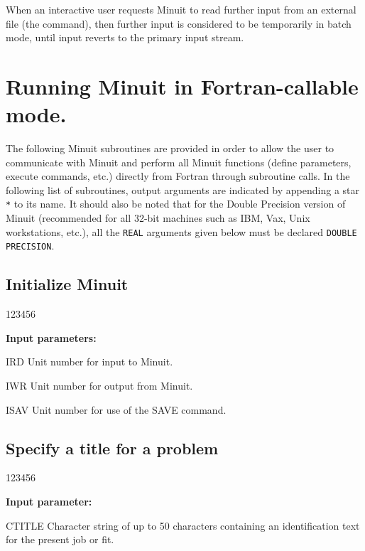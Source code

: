 When an interactive user requests Minuit to read
further input from an external file (the  command),
then further input is considered to be temporarily
in batch mode, until input reverts to the primary input stream.

\section{Running Minuit in Fortran-callable mode.}

The following Minuit subroutines are provided in order to allow
the user to communicate with Minuit and perform all Minuit
functions (define parameters, execute commands, etc.) directly
from Fortran through subroutine calls.
In the following list of subroutines, output arguments are indicated
by appending a star \texttt{*} to its name.
It should also be noted that for the Double Precision version of
Minuit (recommended for all 32-bit machines such as IBM, Vax,
Unix workstations, etc.), all the \texttt{REAL} arguments given below must be
declared \texttt{DOUBLE PRECISION}.

\subsection{Initialize Minuit}
 
 
\begin{DLtt}{123456}
\item[{\rm\bf Input parameters:}]
\item[IRD]  Unit number for input to Minuit.
\item[IWR]  Unit number for output from Minuit.
\item[ISAV] Unit number for use of the SAVE command.
\end{DLtt}
 
\subsection{Specify a title for a problem}
 
 
\begin{DLtt}{123456}
\item[{\rm\bf Input parameter:}]
\item[CTITLE] Character string of up to 50 characters containing
              an identification text for the present job or fit.
\end{DLtt}
 
